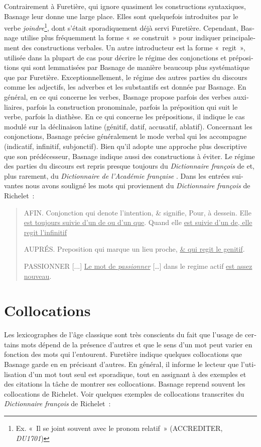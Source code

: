 \documentclass[output=paper,colorlinks,citecolor=brown,arabicfont,chinesefont,booklanguage=french]{langscibook}
\begin{document}
\begin{otherlanguage}{french}
Contrairement à Furetière, qui ignore quasiment les constructions syntaxiques, Basnage leur donne une large place. Elles sont quelquefois introduites par le verbe \emph{joindre}\footnote{Ex. «~Il se joint souvent avec le pronom relatif~» (ACCREDITER, \emph{DU1701})}, dont s’était sporadiquement déjà servi Furetière. Cependant, Basnage utilise plus fréquemment la forme «~se construit~» pour indiquer principalement des constructions verbales. Un autre introducteur est la forme «~regit~», utilisée dans la plupart de cas pour décrire le régime des conjonctions et prépositions qui sont lemmatisées par Basnage de manière beaucoup plus systématique que par Furetière. Exceptionnellement, le régime des autres parties du discours comme les adjectifs, les adverbes et les substantifs est donnée par Basnage. En général, en ce qui concerne les verbes, Basnage propose parfois des verbes auxiliaires, parfois la construction pronominale, parfois la préposition qui suit le verbe, parfois la diathèse. En ce qui concerne les prépositions, il indique le cas modulé sur la déclinaison latine (génitif, datif, accusatif, ablatif). Concernant les conjonctions, Basnage précise généralement le mode verbal qui les accompagne (indicatif, infinitif, subjonctif). Bien qu’il adopte une approche plus descriptive que son prédécesseur, Basnage indique aussi des constructions à éviter. Le régime des parties du discours est repris presque toujours du \emph{Dictionnaire françois} de \citet{Richelet1693} et, plus rarement, du \emph{Dictionnaire de l’Académie française} \citep{AcadFr1694}. Dans les entrées suivantes nous avons souligné les mots qui proviennent du \emph{Dictionnaire françois} de Richelet~:

\begin{quote}
    AFIN. Conjonction qui denote l’intention, \& signifie, Pour, à dessein. Elle \uline{est toujours suivie d’un de ou d’un que}. Quand elle \uline{est suivie d’un de, elle regit l’infinitif}

    AUPRÉS. Preposition qui marque un lieu proche, \uline{\& qui regit le genitif}.

    PASSIONNER [...] \uline{Le mot de \emph{passionner}} […] dans le regime actif \uline{est assez nouveau}.
\end{quote}

\section{Collocations}

Les lexicographes de l’âge classique sont très conscients du fait que l’usage de certains mots dépend de la présence d’autres et que le sens d’un mot peut varier en fonction des mots qui l’entourent. Furetière indique quelques collocations que Basnage garde en en précisant d’autres. En général, il informe le lecteur que l’utilisation d’un mot tout seul est sporadique, tout en assignant à des exemples et des citations la tâche de montrer ses collocations. Basnage reprend souvent les collocations de Richelet. Voir quelques exemples de collocations transcrites du \emph{Dictionnaire françois} de Richelet~: 


\end{otherlanguage}
\end{document}
